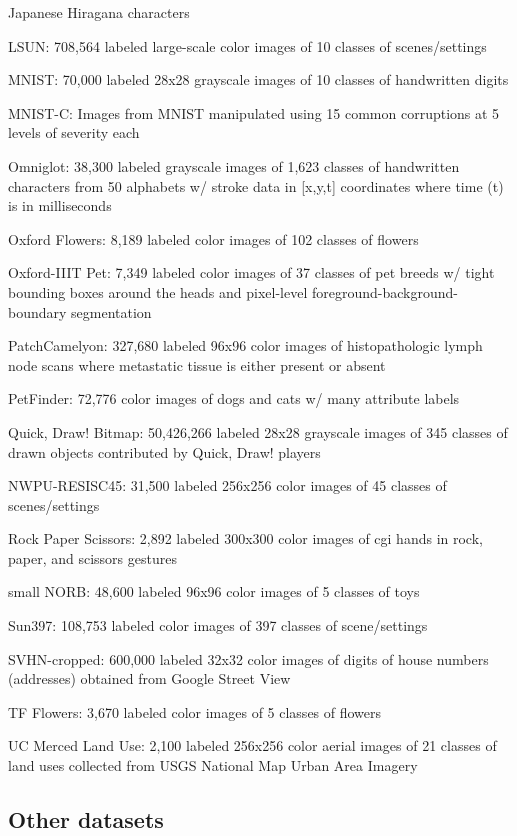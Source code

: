 \documentclass{tufte-handout}
\begin{document}
  Japanese Hiragana characters
\item
  LSUN:
  708,564 labeled large-scale color images of 10 classes of
  scenes/settings
\item
 MNIST:
  70,000 labeled 28x28 grayscale images of 10 classes of handwritten
  digits
\item
 MNIST-C:
  Images from MNIST manipulated using 15 common corruptions at 5 levels
  of severity each
\item
  Omniglot:
  38,300 labeled grayscale images of 1,623 classes of handwritten
  characters from 50 alphabets w/ stroke data in {[}x,y,t{]} coordinates
  where time (t) is in milliseconds
\item
 Oxford
  Flowers: 8,189 labeled color images of 102 classes of flowers
\item
  Oxford-IIIT
  Pet: 7,349 labeled color images of 37 classes of pet breeds w/ tight
  bounding boxes around the heads and pixel-level
  foreground-background-boundary segmentation
\item
  PatchCamelyon:
  327,680 labeled 96x96 color images of histopathologic lymph node scans
  where metastatic tissue is either present or absent
\item
PetFinder:
  72,776 color images of dogs and cats w/ many attribute labels
\item
  Quick,
  Draw! Bitmap: 50,426,266 labeled 28x28 grayscale images of 345
  classes of drawn objects contributed by Quick, Draw! players
\item
NWPU-RESISC45:
  31,500 labeled 256x256 color images of 45 classes of scenes/settings
\item
  Rock
  Paper Scissors: 2,892 labeled 300x300 color images of cgi hands in
  rock, paper, and scissors gestures
\item
small
  NORB: 48,600 labeled 96x96 color images of 5 classes of toys
\item
 Sun397:
  108,753 labeled color images of 397 classes of scene/settings
\item
 SVHN-cropped:
  600,000 labeled 32x32 color images of digits of house numbers
  (addresses) obtained from Google Street View
\item
TF
  Flowers: 3,670 labeled color images of 5 classes of flowers
\item
 UC
  Merced Land Use: 2,100 labeled 256x256 color aerial images of 21
  classes of land uses collected from USGS National Map Urban Area
  Imagery
\ei

\subsection*{Other datasets}\label{other-datasets}
\end{document}
